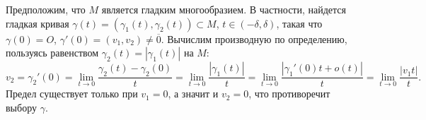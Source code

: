 \begin{myproof}
	Предположим, что $M$ является гладким многообразием. 
	В частности, найдется гладкая кривая $\gamma(t) = (\gamma_1(t), \gamma_2(t)) \subset M$, $t \in (-\delta, \delta)$, такая что $\gamma(0) = O$, $\gamma'(0) = (v_1, v_2) \neq \overline{0}$.
	Вычислим производную по определению, пользуясь равенством $\gamma_2(t) = |\gamma_1(t)|$ на $M$:
	\[ v_2 = \gamma_2'(0) = \lim \limits_{t\to 0} \frac{\gamma_2(t)-\gamma_2(0)}{t} = \lim \limits_{t \to 0} \frac{|\gamma_1(t)|}{t} = \lim \limits_{t \to 0} \frac{|\gamma_1'(0) t + o(t)|}{t} = \lim \limits_{t \to 0} \frac{|v_1 t|}{t}. \] 
	Предел существует только при $v_1 = 0$, а значит и $v_2 = 0$, что противоречит выбору $\gamma$.
\end{myproof}
